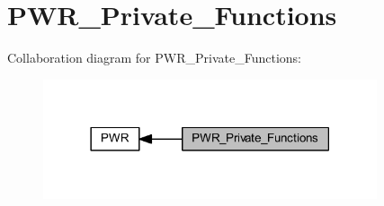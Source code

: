 \hypertarget{group___p_w_r___private___functions}{}\section{P\+W\+R\+\_\+\+Private\+\_\+\+Functions}
\label{group___p_w_r___private___functions}
Collaboration diagram for P\+W\+R\+\_\+\+Private\+\_\+\+Functions\+:
\nopagebreak
\begin{figure}[H]
\begin{center}
\leavevmode
\includegraphics[width=278pt]{group___p_w_r___private___functions}
\end{center}
\end{figure}
